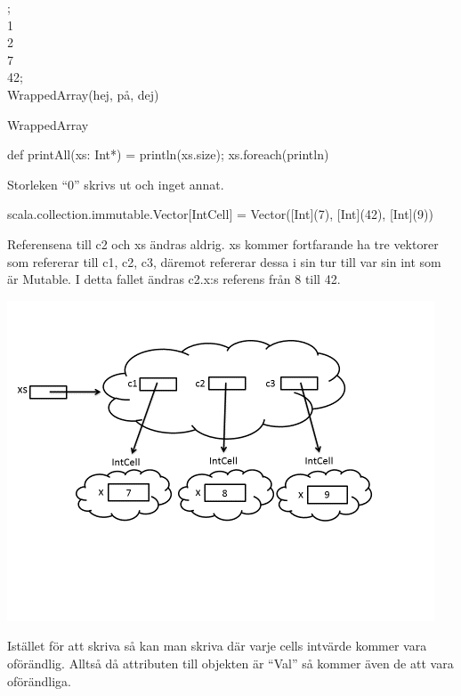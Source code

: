 

\ExerciseSolution{\ExeWeekFIVE}


\Task %

;\\
 1\\
 2\\
 7\\
 42;\\
 WrappedArray(hej, på, dej)

\Subtask WrappedArray

\Subtask def printAll(xs: Int*) = {println(xs.size); xs.foreach(println)}  

\Subtask Storleken “0” skrivs ut och inget annat.



\Task %

\Subtask \begin{REPL}
scala.collection.immutable.Vector[IntCell] = 
    Vector([Int](7), [Int](42), [Int](9))
\end{REPL}
Referensena till c2 och xs ändras aldrig. 
xs kommer fortfarande ha tre vektorer som refererar till c1, c2, c3, däremot refererar dessa i sin tur till var sin int som är Mutable. 
I detta fallet ändras c2.x:s referens från 8 till 42.

\Subtask \includegraphics{../img/w05-solutions/memory-pic-1}

\Subtask Istället för att skriva  så kan man skriva  där varje cells intvärde kommer vara oförändlig. 
Alltså då attributen till objekten är “Val” så kommer även de att vara oförändliga. 


